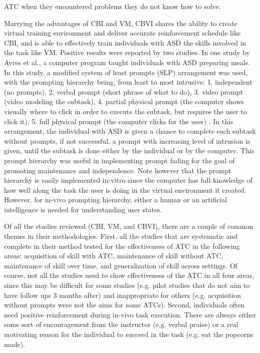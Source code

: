 \documentclass{ut-thesis}
\begin{document}
ATC when they encountered problems they do not know how to solve.

Marrying the advantages of CBI and VM, CBVI shares the ability to create virtual training environment and deliver accurate reinforcement schedule like CBI, and is able to effectively train individuals with ASD the skills involved in the task like VM.  Positive results were reported by two studies.  In one study by Ayres et al., a computer program taught individuals with ASD preparing meals.  In this study, a modified system of least prompts (SLP) arrangement was used, with the prompting hierarchy being, from least to most intrusive: 1. independent (no prompts), 2. verbal prompt (short phrase of what to do), 3. video prompt (video modeling the subtask), 4. partial physical prompt (the computer shows visually where to click in order to execute the subtask, but requires the user to click it), 5. full physical prompt (the computer clicks for the user) \cite{ayres2009acquisition}.  In this arrangement, the individual with ASD is given a chance to complete each subtask without prompts, if not successful, a prompt with increasing level of intrusion is given, until the subtask is done either by the individual or by the computer.  This prompt hierarchy was useful in implementing prompt fading for the goal of promoting maintenance and independence.  Note however that the prompt hierarchy is easily implemented in-vitro since the computer has full knowledge of how well along the task the user is doing in the virtual environment it created.  However, for in-vivo prompting hierarchy, either a human or an artificial intelligence is needed for understanding user states.

Of all the studies reviewed (CBI, VM, and CBVI), there are a couple of common themes in their methodologies.  First, all the studies that are systematic and complete in their method tested for the effectiveness of ATC in the following areas: acquisition of skill with ATC, maintenance of skill without ATC, maintenance of skill over time, and generalization of skill across settings.  Of course, not all the studies need to show effectiveness of the ATC in all four areas, since this may be difficult for some studies (e.g. pilot studies that do not aim to have follow ups 3 months after) and inappropriate for others (e.g. acquisition without prompts were not the aims for some ATCs).  Second, individuals often need positive reinforcement during in-vivo task execution.  There are always either some sort of encouragement from the instructor (e.g. verbal praise) or a real motivating reason for the individual to succeed in the task (e.g. eat the popcorns made).
\end{document}
